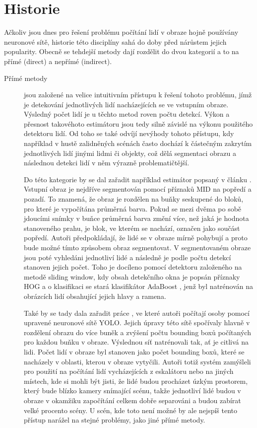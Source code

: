 \chapter{Historie}
\label{sec:History}

Ačkoliv jsou dnes pro řešení problému počítání lidí v obraze hojně používány neuronové sítě, historie této disciplíny sahá do doby před nárůstem jejich popularity.
Obecně se tehdejší metody dají rozdělit do dvou kategorií a to na přímé (direct) a nepřímé (indirect).

\begin{description}

\item[Přímé metody] jsou založené na velice intuitivním přístupu k řešení tohoto problému, jímž je detekování jednotlivých lidí nacházejících se ve vstupním obraze. Výsledný počet lidí je u těchto metod roven počtu detekcí. Výkon a přesnost takovéhoto estimátoru jsou tedy silně závislé na výkonu použitého detektoru lidí.
Od toho se také odvíjí nevýhody tohoto přístupu, kdy například v hustě zalidněných scénách často dochází k částečným zakrytím jednotlivých lidí jinými lidmi či objekty, což dělá segmentaci obrazu a následnou detekci lidí v něm výrazně problematičtější.

Do této kategorie by se dal zařadit například estimátor popsaný v článku \cite{head_and_shoulders}.
Vstupní obraz je nejdříve segmentován pomocí příznaků MID na popředí a pozadí.
To znamená, že obraz je rozdělen na buňky seskupené do bloků, pro které je vypočítána průměrná barva. Pokud se mezi dvěma po sobě jdoucími snímky v buňce průměrná barva změní více, než jaká je hodnota stanoveného prahu, je blok, ve kterém se nachází, označen jako součást popředí.
Autoři předpokládají, že lidé se v obraze mírně pohybují a proto bude možné tímto způsobem obraz segmentovat.
V segmentovaném obraze jsou poté vyhledáni jednotliví lidé a následně je podle počtu detekcí stanoven jejich počet.
Toho je docíleno pomocí detektoru založeného na metodě sliding window, kdy obsah detekčního okna je popsán příznaky HOG a o klasifikaci se stará klasifikátor AdaBoost \cite{AdaBoost}, jenž byl natrénován na obrázcích lidí obsahující jejich hlavy a ramena.

Také by se tady dala zařadit práce \cite{YOLO_counting}, ve které autoři počítají osoby pomocí upravené neuronové sítě YOLO.
Jejich úpravy této sítě spočívaly hlavně v rozdělení obrazu do více buněk a zvýšení počtu bounding boxů počítaných pro každou buňku v obraze. Výslednou síť natrénovali tak, ať je citlivá na lidi.
Počet lidí v obraze byl stanoven jako počet bounding boxů, které se nacházely v oblasti, kterou v obraze vytyčili.
Autoři totiž systém zamýšleli pro použití na počítání lidí vycházejících z eskalátoru nebo na jiných místech, kde si mohli být jisti, že lidé budou procházet úzkým prostorem, který bude blízko kamery snímající scénu, takže jednotliví lidé budou v obraze v okamžiku započítání celkem dobře separováni a budou zabírat velké procento scény.
U scén, kde toto není možné by ale nejspíš tento přístup narážel na stejné problémy, jako jiné přímé metody.



\end{description}
